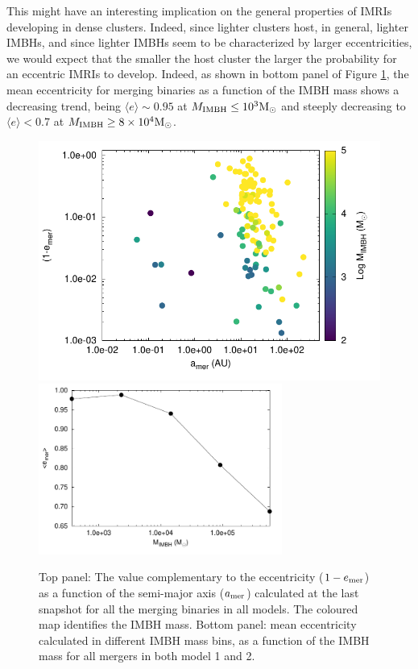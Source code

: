 \documentclass[twocolumn]{aastex62}
\newcommand{\Ms}{{\rm M}_\odot}
\newcommand{\ibh}{{\rm IMBH}}
\begin{document}
This might have an interesting implication on the general properties of IMRIs developing in dense clusters. Indeed, since lighter clusters host, in general, lighter IMBHs, and since lighter IMBHs seem to be characterized by larger eccentricities, we would expect that the smaller the host cluster the larger the probability for an eccentric IMRIs to develop. Indeed, as shown in bottom panel of Figure \ref{F7}, the mean eccentricity for merging binaries as a function of the IMBH mass shows a decreasing trend, being $\langle e\rangle\sim 0.95$ at $M_{\ibh}\leq 10^3\Ms$ and steeply decreasing to $\langle e\rangle < 0.7$ at $M_{\ibh}\geq 8\times 10^4\Ms$.
\begin{figure}
\centering
\includegraphics[width=\columnwidth]{mergers_distr}\\
\includegraphics[width=8cm]{mean_ecce}\\
\caption{Top panel: The value complementary to the eccentricity ($1-e_{\rm mer}$) as a function of the semi-major axis ($a_{\rm mer}$) calculated at the last snapshot for all the merging binaries in all models. The coloured map identifies the IMBH mass. Bottom panel: mean eccentricity calculated in different IMBH mass bins, as a function of the IMBH mass for all mergers in both model 1 and 2.}
\label{F7}
\end{figure}
\end{document}
